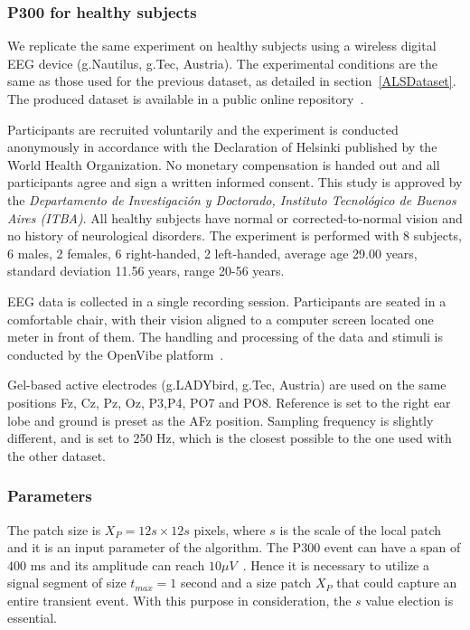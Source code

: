 \documentclass[utf8]{frontiersSCNS} %
\begin{document}
\subsubsection{P300 for healthy subjects}

We replicate the same experiment on healthy subjects using a wireless digital EEG device (g.Nautilus, g.Tec, Austria).  The experimental conditions are the same as those used for the previous dataset, as detailed in section~\ref{ALSDataset}.  The produced dataset is available in a public online repository~\citep{owndataset}.

Participants are recruited voluntarily and the experiment is conducted anonymously in accordance with the Declaration of Helsinki published by the World Health Organization.  No monetary compensation is handed out and all participants agree and sign a written informed consent.  This study is approved by the \textit{Departamento de Investigación y Doctorado, Instituto Tecnológico de Buenos Aires (ITBA)}.  All healthy subjects have normal or corrected-to-normal vision and no history of neurological disorders. The experiment is performed with 8 subjects, 6 males, 2 females, 6 right-handed, 2 left-handed, average age 29.00 years, standard deviation  11.56 years, range 20-56 years.

EEG data is collected in a single recording session. Participants are seated in a comfortable chair, with their vision aligned to a computer screen located one meter in front of them.  The handling and processing of the data and stimuli is conducted by the OpenVibe platform~\citep{Renard2010}. 

Gel-based active electrodes (g.LADYbird, g.Tec, Austria) are used on the same positions Fz, Cz, Pz, Oz, P3,P4, PO7 and PO8.  Reference is set to the right ear lobe and ground is preset as the AFz position.   Sampling frequency is slightly different, and is set to 250 Hz, which is the closest possible to the one used with the other dataset.



\subsubsection{Parameters}

The patch size is $X_P = 12s \times 12s$ pixels, where $s$ is the scale of the local patch and it is an input parameter of the algorithm. The P300 event can have a span of $400$ ms and its amplitude can reach $ 10 \mu V $~\citep{Rao2013}.  Hence it is necessary to utilize a signal segment of size $t_{max} = 1$ second and a size patch $X_P$ that could capture an entire transient event. With this purpose in consideration, the $s$ value election is essential.
\end{document}
